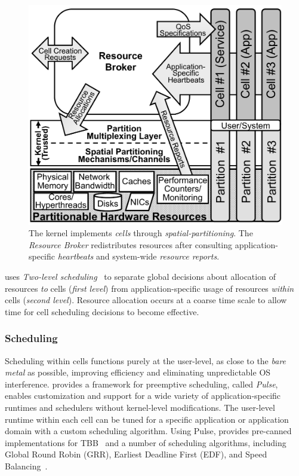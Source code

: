 \begin{figure}[t]
\centering
\includegraphics[width=0.885\linewidth]{Figures/NewPolicyFig-Tess}
\caption{
The \tess kernel implements \emph{cells} through \emph{spatial-partitioning}.
The \emph{Resource Broker} redistributes resources after consulting application-specific
\emph{heartbeats} and system-wide \emph{resource reports}.
}
\label{fig:tess-arch}
\end{figure}

\tess uses \emph{Two-level scheduling}~\cite{leiner07,ober08} %
to separate global decisions about allocation of resources \emph{to}
cells (\emph{first level}) from application-specific usage of resources
\emph{within} cells (\emph{second level}). 
Resource allocation occurs at a coarse time scale to allow time for cell scheduling decisions to become effective.

\subsubsection{Scheduling}
Scheduling within cells functions purely at the user-level, as
close to the \emph{bare metal} as possible, improving efficiency and
eliminating unpredictable OS interference.  \tess provides a framework for preemptive
scheduling, called \emph{Pulse}, enables customization and support for a wide
variety of application-specific runtimes and schedulers without
kernel-level modifications. 
The user-level runtime within each cell can be tuned for a specific
application or application domain with a custom scheduling algorithm.
Using Pulse, \tess provides pre-canned
implementations for TBB~\cite{tbb07} and a number of scheduling algorithms,
including Global Round Robin (GRR), Earliest Deadline First
(EDF), and Speed Balancing~\cite{juggle2013}.  
 

